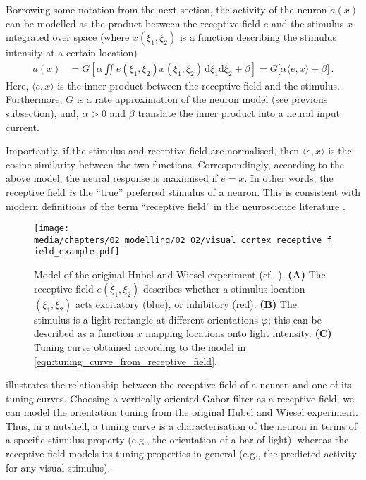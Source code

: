 Borrowing some notation from the next section, the activity of the neuron $a(x)$ can be modelled as the product between the receptive field $e$ and the stimulus $x$ integrated over space (where $x(\xi_1, \xi_2)$ is a function describing the stimulus intensity at a certain location)
\begin{align}
	a(x) &= G\left[ \alpha \iint e(\xi_1, \xi_2) x(\xi_1, \xi_2) \,\mathrm{d}\xi_1\mathrm{d}\xi_2 + \beta \right]
		= G \bigl[ \alpha \langle e, x \rangle + \beta \bigr] \,.
	\label{eqn:tuning_curve_from_receptive_field}
\end{align}
Here, $\langle e, x \rangle$ is the inner product between the receptive field and the stimulus.
Furthermore, $G$ is a rate approximation of the neuron model (see previous subsection), and, $\alpha > 0$ and $\beta$ translate the inner product into a neural input current.

Importantly, if the stimulus and receptive field are normalised, then $\langle e, x \rangle$ is the cosine similarity between the two functions.
Correspondingly, according to the above model, the neural response is maximised if $e = x$.
In other words, the receptive field \emph{is} the \enquote{true} preferred stimulus of a neuron.
This is consistent with modern definitions of the term \enquote{receptive field} in the neuroscience literature \citep[cf.][]{troy2009retinal}.

\begin{figure}
	\centering
	\texttt{[image: media/chapters/02\_modelling/02\_02/visual\_cortex\_receptive\_field\_example.pdf]}
	\caption[Model of the Hubel and Wiesel experiment]{Model of the original Hubel and Wiesel experiment (cf.~). \textbf{(A)} The receptive field $e(\xi_1, \xi_2)$ describes whether a stimulus location $(\xi_1, \xi_2)$ acts excitatory (blue), or inhibitory (red). \textbf{(B)} The stimulus is a light rectangle at different orientations $\varphi$; this can be described as a function $x$ mapping locations onto light intensity. \textbf{(C)} Tuning curve obtained according to the model in \cref{eqn:tuning_curve_from_receptive_field}.}
	\label{fig:visual_cortex_receptive_field_example}
\end{figure}

 illustrates the relationship between the receptive field of a neuron and one of its tuning curves.
Choosing a vertically oriented Gabor filter as a receptive field, we can model the orientation tuning from the original Hubel and Wiesel experiment.
Thus, in a nutshell, a tuning curve is a characterisation of the neuron in terms of a specific stimulus property (e.g., the orientation of a bar of light), whereas the receptive field models its tuning properties in general (e.g., the predicted activity for any visual stimulus).

